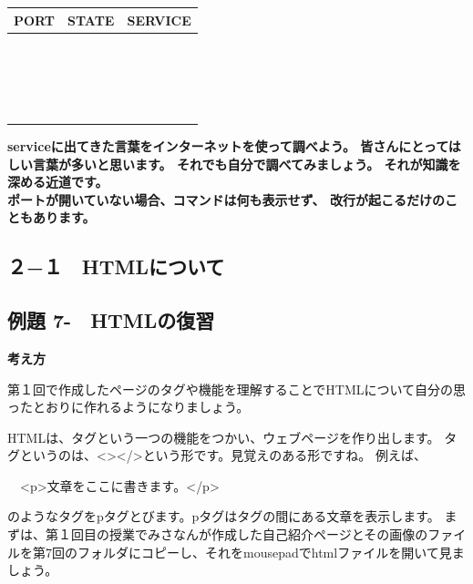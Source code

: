 \documentclass[a4paper,12pt,dvipdfmx]{jarticle}
\newcounter{Exercise}
\renewcommand\theExercise{例題 7-\arabic{Exercise}}
\begin{document}
\begin{flushleft}
	\tablefirsthead{}
	\tablehead{}
	\tabletail{}
	\tablelasttail{}
	\begin{supertabular}{|m{5.467cm}|m{5.4690003cm}|m{5.155cm}|}
		\hline
		PORT &
		STATE &
		SERVICE\\\hline
		~
		&
		~
		&
		~
		\\\hline
		~
		&
		~
		&
		~
		\\\hline
		~
		&
		~
		&
		~
		\\\hline
		~
		&
		~
		&
		~
		\\\hline
	\end{supertabular}
\end{flushleft}
{\bfseries
serviceに出てきた言葉をインターネットを使って調べよう。
皆さんにとってはしい言葉が多いと思います。
それでも自分で調べてみましょう。
それが知識を深める近道です。\\
ポートが開いていない場合、コマンドは何も表示せず、
改行が起こるだけのこともあります。
}

\clearpage\subsection*{２−１　HTMLについて}
\subsection*{\theExercise　HTMLの復習}
{\bfseries
	考え方\newline

	第１回で作成したページのタグや機能を理解することでHTMLについて自分の思ったとおりに作れるようになりましょう。}


\bigskip

HTMLは、タグという一つの機能をつかい、ウェブページを作り出します。\newline
タグというのは、{\textless}{\textgreater}{\textless}/{\textgreater}という形です。見覚えのある形ですね。\newline
例えば、

\ \ {\textless}p{\textgreater}文章をここに書きます。{\textless}/p{\textgreater}

のようなタグをpタグとびます。pタグはタグの間にある文章を表示します。\newline
まずは、第１回目の授業でみさなんが作成した自己紹介ページとその画像のファイルを第7回のフォルダにコピーし、それをmousepadでhtmlファイルを開いて見ましょう。
\end{document}

